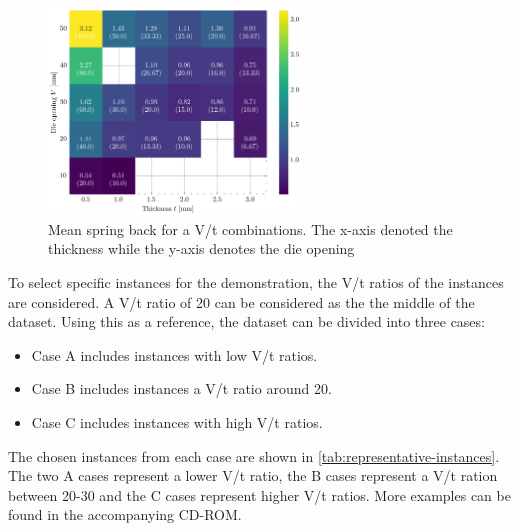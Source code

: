 \begin{figure}[h]
    \begin{tcolorbox}[arc=0pt,boxrule=0.5pt]
        \centering
        \includegraphics[width=0.6\textwidth]{chap5/images/mean_springback_heatmap}
    \end{tcolorbox}
    \caption{Mean spring back for a V/t combinations. The x-axis denoted the thickness while the y-axis denotes the
    die opening}
    \label{fig:springback-heatmap}
\end{figure}


To select specific instances for the demonstration, the V/t ratios of the instances are considered.
A V/t ratio of 20 can be considered as the the middle of the dataset. Using this as a reference, the dataset can be
divided into three cases:

\begin{itemize}
    \item Case A includes instances with low V/t ratios.
    \item Case B includes instances a V/t ratio around 20.
    \item Case C includes instances with high V/t ratios.
\end{itemize}

The chosen instances from each case are shown in \cref{tab:representative-instances}.
The two A cases represent a lower V/t ratio, the B cases represent a V/t ration between 20-30 and the C cases
represent higher V/t ratios.
More examples can be found in the accompanying CD-ROM.

